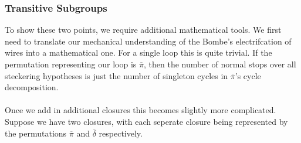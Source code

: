 \subsubsection{Transitive Subgroups}
\noindent To show these two points, we require additional mathematical tools. We first need to translate our mechanical understanding of the Bombe's electrifcation of wires into a mathematical one. For a single loop this is quite trivial. If the permutation representing our loop is $\overline\pi$, then the number of normal stops over all steckering hypotheses is just the number of singleton cycles in $\overline\pi$'s cycle decomposition.
\\\\Once we add in additional closures this becomes slightly more complicated. Suppose we have two closures, with each seperate closure being represented by the permutations $\overline\pi$ and $\overline\delta$ respectively.
